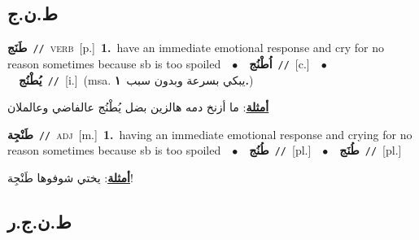 \documentclass[10pt,a4paper,twoside]{article} %
\begin{document}
\begin{multicols}{2}
\vspace{-3mm}
\subsection*{\color{blue}\foreignlanguage{arabic}{ط.ن.ج}\color{blue}{}} 

{\setlength\topsep{0pt}\textbf{\foreignlanguage{arabic}{طَنَج}}\ {\color{gray}\texttt{//}\color{black}}\ \textsc{verb}\ [p.]\ \textbf{1.}~have an immediate emotional response and cry for no reason sometimes because sb is too spoiled\ \ $\bullet$\ \ \setlength\topsep{0pt}\textbf{\foreignlanguage{arabic}{اُطْنُج}}\ {\color{gray}\texttt{//}\color{black}}\ [c.]\ \ $\bullet$\ \ \setlength\topsep{0pt}\textbf{\foreignlanguage{arabic}{يُطْنُج}}\ {\color{gray}\texttt{//}\color{black}}\ [i.]\ \color{gray}(msa. \foreignlanguage{arabic}{يبكي بسرعة وبدون سبب}~\foreignlanguage{arabic}{\textbf{١.}})\color{black}\  \begin{flushright}\color{gray}\foreignlanguage{arabic}{\textbf{\underline{\foreignlanguage{arabic}{أمثلة}}}: ما أزنخ دمه هالزين بضل يُطْنُج عالفاضي وعالملان}\end{flushright}\color{black}} \vspace{2mm}

{\setlength\topsep{0pt}\textbf{\foreignlanguage{arabic}{طَنْجِة}}\ {\color{gray}\texttt{//}\color{black}}\ \textsc{adj}\ [m.]\ \textbf{1.}~having an immediate emotional response and crying for no reason sometimes because sb is too spoiled\ \ $\bullet$\ \ \setlength\topsep{0pt}\textbf{\foreignlanguage{arabic}{طُنُج}}\ {\color{gray}\texttt{//}\color{black}}\ [pl.]\ \ $\bullet$\ \ \setlength\topsep{0pt}\textbf{\foreignlanguage{arabic}{طُنَج}}\ {\color{gray}\texttt{//}\color{black}}\ [pl.]\  \begin{flushright}\color{gray}\foreignlanguage{arabic}{\textbf{\underline{\foreignlanguage{arabic}{أمثلة}}}: يختي شوفوها طَنْجِة!}\end{flushright}\color{black}} \vspace{2mm}

\vspace{-3mm}
\subsection*{\color{blue}\foreignlanguage{arabic}{ط.ن.ج.ر}\color{blue}{}} 


\end{multicols}
\end{document}
